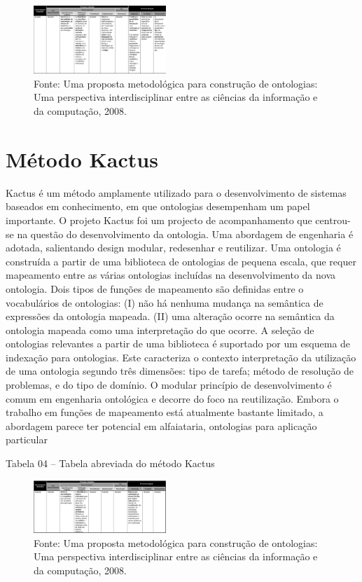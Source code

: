 \documentclass[a4paper]{report}
\begin{document}
\begin{figure}[h] 
\centering %
\includegraphics[width=5cm]{Figuras/6.png} %
\caption{Fonte: Uma proposta metodológica para construção de ontologias: Uma perspectiva interdisciplinar entre as ciências da informação e da computação, 2008.}
\end{figure}

\section{Método Kactus} 
\qquad Kactus é um método amplamente utilizado para o desenvolvimento de sistemas baseados em conhecimento, em que ontologias desempenham um papel importante. O projeto Kactus foi um projecto de acompanhamento que centrou-se na questão do desenvolvimento da ontologia. Uma abordagem de engenharia é adotada, salientando design modular, redesenhar e reutilizar. Uma ontologia é construída a partir de uma biblioteca de ontologias de pequena escala, que requer mapeamento entre as várias ontologias incluídas na desenvolvimento da nova ontologia. Dois tipos de funções de mapeamento são definidas entre o vocabulários de ontologias:
(I) não há nenhuma mudança na semântica de expressões da ontologia mapeada.
(II) uma alteração ocorre na semântica da ontologia mapeada como uma interpretação do que ocorre.
	A seleção de ontologias relevantes a partir de uma biblioteca é suportado por um esquema de indexação para ontologias. Este caracteriza o contexto interpretação da utilização de uma ontologia segundo três dimensões: tipo de tarefa; método de resolução de problemas, e do tipo de domínio. O modular princípio de desenvolvimento é comum em engenharia ontológica e decorre do foco na reutilização. Embora o trabalho em funções de mapeamento está atualmente bastante limitado, a abordagem parece ter potencial em alfaiataria, ontologias para aplicação particular

Tabela 04 – Tabela abreviada do método Kactus

\begin{figure}[h] 
\centering %
\includegraphics[width=5cm]{Figuras/7.png} %
\caption{Fonte: Uma proposta metodológica para construção de ontologias: Uma perspectiva interdisciplinar entre as ciências da informação e da computação, 2008.}
\end{figure}
\end{document}
